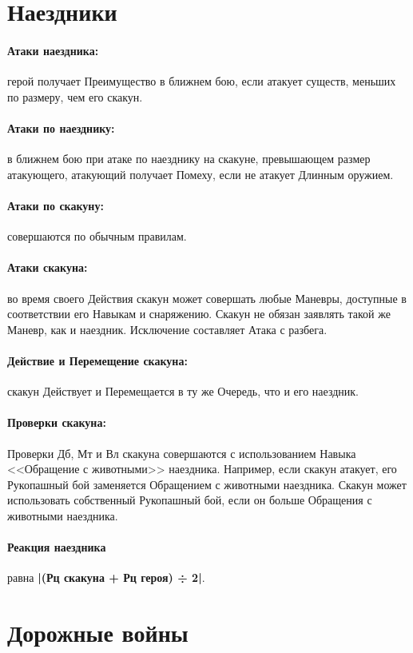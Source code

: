 \section{Наездники}
\paragraph{Атаки наездника:} герой получает Преимущество в ближнем бою, если атакует существ, меньших по размеру, чем его скакун.
\paragraph{Атаки по наезднику:} в ближнем бою при атаке по наезднику на скакуне, превышающем размер атакующего, атакующий получает Помеху, если не атакует Длинным оружием.
\paragraph{Атаки по скакуну:} совершаются по обычным правилам.
\paragraph{Атаки скакуна:} во время своего Действия скакун может совершать любые Маневры, доступные в соответствии его Навыкам и снаряжению. Скакун не обязан заявлять такой же Маневр, как и наездник. Исключение составляет Атака с разбега.
\paragraph{Действие и Перемещение скакуна:} скакун Действует и Перемещается в ту же Очередь, что и его наездник.
\paragraph{Проверки скакуна:} Проверки Дб, Мт и Вл скакуна совершаются с использованием Навыка <<Обращение с животными>> наездника.
\newline
Например, если скакун атакует, его Рукопашный бой заменяется Обращением с животными наездника. Скакун может использовать собственный Рукопашный бой, если он больше Обращения с животными наездника.
\paragraph{Реакция наездника} равна \textbf{|(Рц скакуна + Рц героя) ÷ 2|}.

\section{Дорожные войны}
